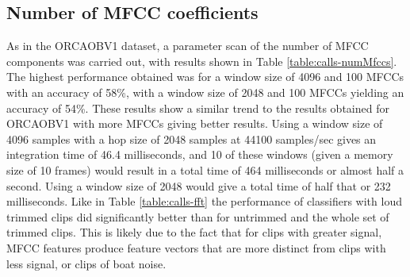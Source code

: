 \documentclass[12pt,oneside]{book}
\begin{document}
%
%
\subsection{Number of MFCC coefficients}

As in the ORCAOBV1 dataset, a parameter scan of the number of MFCC
components was carried out, with results shown in Table
\ref{table:calls-numMfccs}.  The highest performance obtained was for
a window size of 4096 and 100 MFCCs with an accuracy of 58\%, with a
window size of 2048 and 100 MFCCs yielding an accuracy of 54\%.  These
results show a similar trend to the results obtained for ORCAOBV1 with
more MFCCs giving better results.  Using a window size of 4096 samples
with a hop size of 2048 samples at 44100 samples/sec gives an
integration time of 46.4 milliseconds, and 10 of these windows (given
a memory size of 10 frames) would result in a total time of 464
milliseconds or almost half a second.  Using a window size of 2048
would give a total time of half that or 232 milliseconds.  Like in
Table \ref{table:calls-fft} the performance of classifiers with loud
trimmed clips did significantly better than for untrimmed and the
whole set of trimmed clips.  This is likely due to the fact that for
clips with greater signal, MFCC features produce feature vectors that
are more distinct from clips with less signal, or clips of boat noise.
\end{document}
